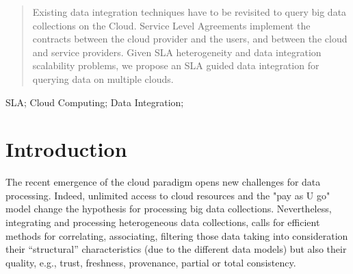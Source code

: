 \documentclass[10pt, conference, compsocconf]{IEEEtran}
\begin{document}




\maketitle


\begin{abstract}
Existing data integration techniques have to be revisited  to query big data collections  on the Cloud.
Service Level Agreements implement the contracts between the cloud provider and the users, and between  the cloud and service providers. 
Given SLA heterogeneity and  data integration scalability problems, we propose an SLA guided data integration for querying data on multiple clouds.
\end{abstract}

\begin{IEEEkeywords}
SLA; Cloud Computing; Data Integration;
\end{IEEEkeywords}


%
\IEEEpeerreviewmaketitle



\section{Introduction}
%

The recent emergence of  the cloud paradigm opens new challenges for data processing. Indeed, unlimited access to cloud resources and the "pay as U go" model change the hypothesis for processing big data collections.
Nevertheless, integrating and processing heterogeneous data collections, calls for efficient methods for correlating, associating, filtering those data taking into consideration their “structural” characteristics (due to the different data models) but also their quality, e.g., trust, freshness, provenance, partial or total consistency.
\end{document}
